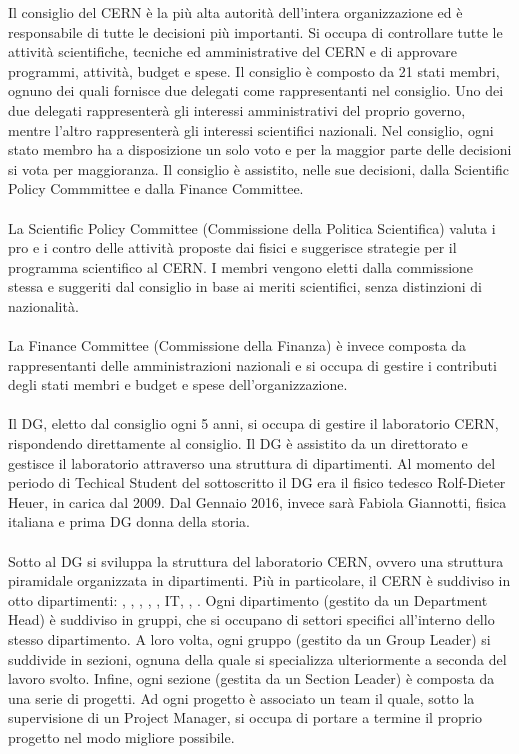 			Il consiglio del \ac{CERN} è la più alta autorità dell'intera organizzazione ed è responsabile di tutte le decisioni più importanti. Si occupa di controllare tutte le attività scientifiche, tecniche ed amministrative del \ac{CERN} e di approvare programmi, attività, budget e spese. Il consiglio è composto da 21 stati membri, ognuno dei quali fornisce due delegati come rappresentanti nel consiglio. Uno dei due delegati rappresenterà gli interessi amministrativi del proprio governo, mentre l'altro rappresenterà gli interessi scientifici nazionali. Nel consiglio, ogni stato membro ha a disposizione un solo voto e per la maggior parte delle decisioni si vota per maggioranza. Il consiglio è assistito, nelle sue decisioni, dalla Scientific Policy Commmittee e dalla Finance Committee.\\
			\\
			La Scientific Policy Committee (Commissione della Politica Scientifica) valuta i pro e i contro delle attività proposte dai fisici e suggerisce strategie per il programma scientifico al \ac{CERN}. I membri vengono eletti dalla commissione stessa e suggeriti dal consiglio in base ai meriti scientifici, senza distinzioni di nazionalità.\\
			\\
			La Finance Committee (Commissione della Finanza) è invece composta da rappresentanti delle amministrazioni nazionali e si occupa di gestire i contributi degli stati membri e budget e spese dell'organizzazione.\\
			\\
			Il \ac{DG}, eletto dal consiglio ogni 5 anni, si occupa di gestire il laboratorio \ac{CERN}, rispondendo direttamente al consiglio. Il \ac{DG} è assistito da un direttorato e gestisce il laboratorio attraverso una struttura di dipartimenti. Al momento del periodo di Techical Student del sottoscritto il \ac{DG} era il fisico tedesco Rolf-Dieter Heuer, in carica dal 2009. Dal Gennaio 2016, invece sarà Fabiola Giannotti, fisica italiana e prima \ac{DG} donna della storia.\\
			\\
			Sotto al \ac{DG} si sviluppa la struttura del laboratorio \ac{CERN}, ovvero una struttura piramidale organizzata in dipartimenti. Più in particolare, il \ac{CERN} è suddiviso in otto dipartimenti: , , , , , \ac{IT}, , . Ogni dipartimento (gestito da un Department Head) è suddiviso in gruppi, che si occupano di settori specifici all'interno dello stesso dipartimento. A loro volta, ogni gruppo (gestito da un Group Leader) si suddivide in sezioni, ognuna della quale si specializza ulteriormente a seconda del lavoro svolto. Infine, ogni sezione (gestita da un Section Leader) è composta da una serie di progetti. Ad ogni progetto è associato un team il quale, sotto la supervisione di un Project Manager, si occupa di portare a termine il proprio progetto nel modo migliore possibile. \cite{cern:structure}\\

